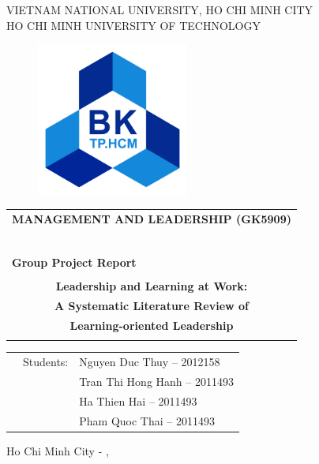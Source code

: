 \begin{titlepage}
\begin{center}
VIETNAM NATIONAL UNIVERSITY, HO CHI MINH CITY \\
HO CHI MINH UNIVERSITY OF TECHNOLOGY \\
\end{center}

\vspace{1cm}

\begin{figure}[h!]
\begin{center}
\includegraphics[width=5cm]{images/hcmut.png}
\end{center}
\end{figure}

\vspace{1cm}


\begin{center}
\begin{tabular}{c}
\multicolumn{1}{l}{\textbf{{\Large MANAGEMENT AND LEADERSHIP (GK5909)}}}\\
~~\\
\hline
\\
\multicolumn{1}{l}{\textbf{{\Large Group Project Report}}}\\
\\
\textbf{{\Huge Leadership and Learning at Work:}}\\
\textbf{{\Huge A Systematic Literature Review of}}\\
\textbf{{\Huge Learning-oriented Leadership}}\\
\\
\hline
\end{tabular}
\end{center}

\vspace{1.5cm}

\begin{table}[h]
\begin{tabular}{rrl}
\hspace{5 cm} & Students: & Nguyen Duc Thuy     -- 2012158 \\
              &           & Tran Thi Hong Hanh  -- 2011493 \\
              &           & Ha Thien Hai        -- 2011493 \\
              &           & Pham Quoc Thai      -- 2011493


\end{tabular}
\end{table}
\vspace{1.5cm}
\begin{center}
{\footnotesize Ho Chi Minh City - \monthname[\the\month], \the\year}
\end{center}
\end{titlepage}
    